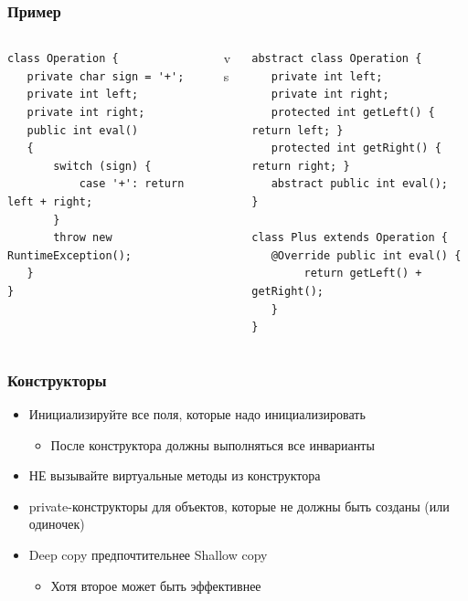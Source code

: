 \documentclass[xetex,mathserif,serif]{beamer}
\begin{document}
	\begin{frame}[fragile]
		\frametitle{Пример}
		\begin{footnotesize}
			\begin{columns}
				\begin{column}{0.35\textwidth}
					\begin{verbatim}
class Operation {
   private char sign = '+';
   private int left;
   private int right;
   public int eval()
   {
       switch (sign) {
           case '+': return left + right;
       }
       throw new RuntimeException();
   }
}
					\end{verbatim}
				\end{column}
				\begin{column}{0.1\textwidth}
					vs
				\end{column}
				\begin{column}{0.45\textwidth}
					\begin{verbatim}
abstract class Operation {
   private int left;
   private int right;
   protected int getLeft() { return left; }
   protected int getRight() { return right; }
   abstract public int eval();
}

class Plus extends Operation {
   @Override public int eval() { 
        return getLeft() + getRight(); 
   }
}
					\end{verbatim}
				\end{column}
			\end{columns}
		\end{footnotesize}
\end{frame}

	\begin{frame}
		\frametitle{Конструкторы}
		\begin{itemize}
			\item Инициализируйте все поля, которые надо инициализировать
			\begin{itemize}
				\item После конструктора должны выполняться все инварианты
			\end{itemize}
			\item НЕ вызывайте виртуальные методы из конструктора
			\item private-конструкторы для объектов, которые не должны быть созданы (или одиночек)
			\item Deep copy предпочтительнее Shallow copy
			\begin{itemize}
				\item Хотя второе может быть эффективнее
			\end{itemize}
		\end{itemize}
	\end{frame}
\end{document}
